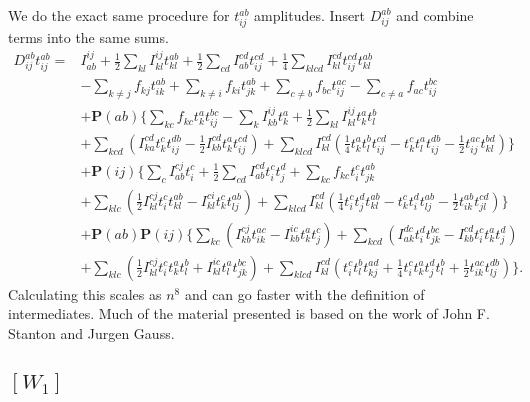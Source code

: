\documentclass[graybox,sectrefs,envcountresetchap,open=right]{svmonodo}
\begin{document}
We do the exact same procedure for $t_{ij}^{ab}$ amplitudes. Insert $D_{ij}^{ab}$ and combine terms into the same sums.
\begin{align}
D_{ij}^{ab} t_{ij}^{ab} = & 
I_{ab}^{ij}
+ \frac{1}{2} \sum_{kl} I_{kl}^{ij} t_{kl}^{ab} 
+ \frac{1}{2} \sum_{cd} I_{ab}^{cd} t_{ij}^{cd}
+ \frac{1}{4} \sum_{klcd} I_{kl}^{cd}
t_{ij}^{cd} t_{kl}^{ab} 
 \nonumber \\ &
- \sum_{k \not= j} f_{kj} t_{ik}^{ab} 
+ \sum_{k \not= i} f_{ki} t_{jk}^{ab}
+ \sum_{c \not= b} f_{bc} t_{ij}^{ac}
- \sum_{c \not= a} f_{ac} t_{ij}^{bc}
 \nonumber \\ &
+ \mathbf{P}(ab) 
\{
\sum_{kc} f_{kc} t_k^a t_{ij}^{bc}
- \sum_k I_{kb}^{ij} t_k^a
+ \frac{1}{2} \sum_{kl} I_{kl}^{ij} t_k^a t_l^b 
\nonumber \\ &
+ \sum_{kcd} 
(
I_{ka}^{cd} t_k^c t_{ij}^{db} 
- \frac{1}{2} I_{kb}^{cd} t_k^a t_{ij}^{cd} 
)
+ \sum_{klcd} I_{kl}^{cd} (\frac{1}{4} t_k^a t_l^b t_{ij}^{cd} - t_k^c t_l^a t_{ij}^{db} - \frac{1}{2} t_{ij}^{ac} t_{kl}^{bd})
\}
\nonumber \\ &
+ \mathbf{P}(ij)
\{
\sum_c I_{ab}^{cj} t_i^c
+ \frac{1}{2} \sum_{cd} I_{ab}^{cd} t_i^c t_j^d 
+ \sum_{kc} f_{kc} t_i^c t_{jk}^{ab}
\nonumber \\ &
+ \sum_{klc}
( 
\frac{1}{2} 
I_{kl}^{cj} t_i^c t_{kl}^{ab}
- I_{kl}^{ci} t_k^c t_{lj}^{ab}
)
+ \sum_{klcd} I_{kl}^{cd}
(
\frac{1}{4} t_i^c t_j^d t_{kl}^{ab} 
- t_k^c t_i^d t_{lj}^{ab} 
- \frac{1}{2} t_{ik}^{ab} t_{jl}^{cd}
)
\}
\nonumber \\ &
+ \mathbf{P}(ab) \mathbf{P}(ij)
\{
\sum_{kc}
(
I_{kb}^{cj} t_{ik}^{ac}
- I_{kb}^{ic} t_k^a t_j^c
)
+ \sum_{kcd}
(
I_{ak}^{dc} t_i^d t_{jk}^{bc}
- I_{kb}^{cd} t_i^c t_k^a t_j^d
)
\nonumber \\ &
+ \sum_{klc}
(
\frac{1}{2} I_{kl}^{cj} t_i^c t_k^a t_l^b
+ I_{kl}^{ic} t_l^a t_{jk}^{bc}
)
+ \sum_{klcd} I_{kl}^{cd}
(
t_i^c t_l^b t_{kj}^{ad}
+ \frac{1}{4} t_i^c t_k^a t_j^d t_l^b
+ \frac{1}{2} t_{ik}^{ac} t_{lj}^{db} 
)
\} . 
\end{align}
Calculating this scales as $n^8$ and can go faster with the definition of intermediates. Much of the material presented is based on the work of John F. Stanton and Jurgen Gauss.

\subsection{$[W_1]$}
\end{document}

